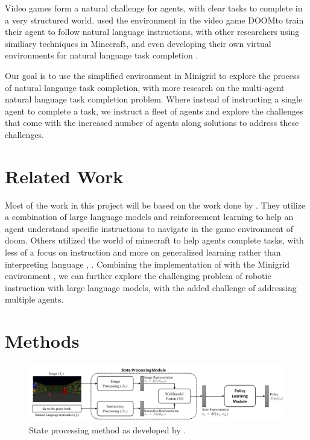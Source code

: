 \documentclass[11pt]{article}
\begin{document}
Video games form a natural challenge for agents, with clear tasks to complete in a very structured world. \cite{Chaplot2017} used the environment in the video game DOOM\texttrademark to train their agent to follow natural language instructions, with other researchers using similiary techniques in Minecraft\texttrademark \cite{Tessler2020}, and even developing their own virtual environments for natural language task completion \cite{Anderson2017} \cite{Wang2024}. 

Our goal is to use the simplified environment in Minigrid \cite{MinigridMiniworld23} to explore the process of natural langauge task completion, with more research on the multi-agent natural language task completion problem. Where instead of instructing a single agent to complete a task, we instruct a fleet of agents and explore the challenges that come with the increased number of agents along solutions to address these challenges. 

\section{Related Work}
Most of the work in this project will be based on the work done by \cite{Chaplot2017}. They utilize a combination of large language models and reinforcement learning to help an agent understand specific instructions to navigate in the game environment of doom. Others utilized the world of minecraft to help agents complete tasks, with less of a focus on instruction and more on generalized learning rather than interpreting language \cite{Oh2017}, \cite{Tessler2020}. Combining the implementation of \cite{Chaplot2017} with the Minigrid environment \cite{MinigridMiniworld23}, \cite{chevalier2018babyai} we can further explore the challenging problem of robotic instruction with large language models, with the added challenge of addressing multiple agents.

\section{Methods}
\begin{figure}[!t]
  \centering
  \includegraphics[width=\linewidth]{figs/stateprocessing.png}
  \caption{State processing method as developed by \cite{Chaplot2017}.}
  \label{fig:stateprocess}
\end{figure}
\end{document}
